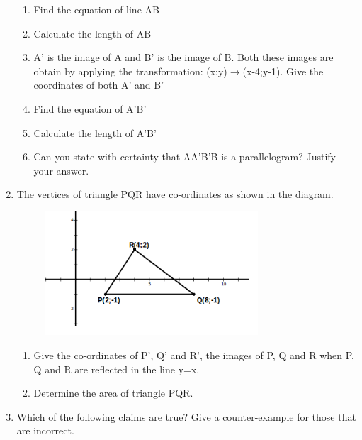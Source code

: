 \begin{enumerate}[noitemsep, label=\textbf{\arabic*}. ]
\begin{figure}[H]
\begin{center}
\vspace{.1in}
\end{center}
\end{figure}       \begin{enumerate}[noitemsep, label=\textbf{\alph*}. ] 
\item Find the equation of line AB \item Calculate the length of AB\item  A' is the image of A and B' is the image of B. Both these images are obtain by applying the transformation: (x;y)$\to $(x-4;y-1). Give the coordinates of both A' and B'\item Find the equation of A'B'\item Calculate the length of A'B'\item Can you state with certainty that AA'B'B is a parallelogram? Justify your answer.\end{enumerate}
    \item The vertices of triangle PQR have co-ordinates as shown in the diagram.
\setcounter{subfigure}{0}
\begin{figure}[H] %
\begin{center}
\label{m39358*id743344!!!underscore!!!media}\label{m39358*id743344!!!underscore!!!printimage}\includegraphics[width=300px]{col11306.imgs/m39358_mg10c14_6.png} %
\vspace{2pt}
\vspace{.1in}
\end{center}
\end{figure}       
\begin{enumerate}[noitemsep, label=\textbf{\alph*}. ] 
\item Give the co-ordinates of  P', Q' and R', the images of P, Q and R when P, Q and R are reflected in the line y=x.\item Determine the area of triangle PQR.\end{enumerate}
\item Which of the following claims are true? Give a counter-example for those that are incorrect.

\end{enumerate}
